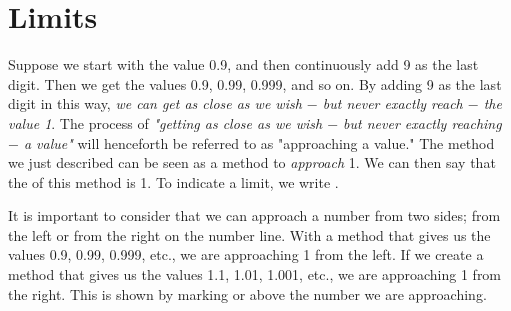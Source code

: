 




\section{Limits}
Suppose we start with the value 0.9, and then continuously add 9 as the last digit. Then we get the values 0.9, 0.99, 0.999, and so on. By adding 9 as the last digit in this way, \textsl{we can get as close as we wish $-$ but never exactly reach $-$ the value 1}. The process of \textsl{"getting as close as we wish $-$ but never exactly reaching $-$ a value"} will henceforth be referred to as "approaching a value." The method we just described can be seen as a method to \textsl{approach} 1. We can then say that the  of this method is 1.
To indicate a limit, we write \sym{$ \lim $}.\vsk

It is important to consider that we can approach a number from two sides; from the left or from the right on the number line. With a method that gives us the values 0.9, 0.99, 0.999, etc., we are approaching 1 from the left. If we create a method that gives us the values 1.1, 1.01, 1.001, etc., we are approaching 1 from the right. This is shown by marking \sym{$ + $} or \sym{$ - $} above the number we are approaching.

\regv


\newpage

